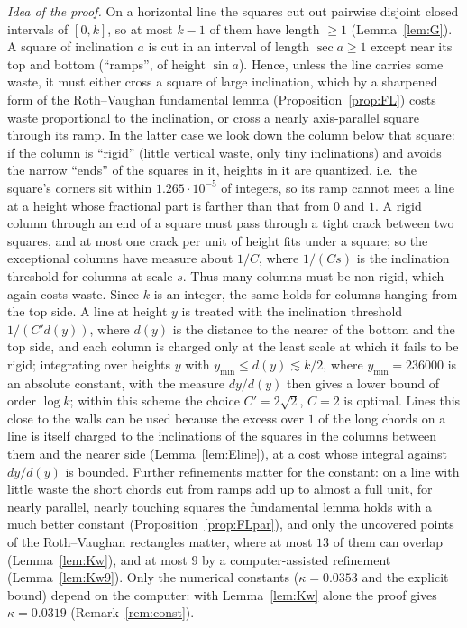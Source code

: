 \documentclass[11pt]{amsart}
\theoremstyle{definition}
\theoremstyle{remark}
\begin{document}
\noindent\emph{Idea of the proof.}
On a horizontal line the squares cut out pairwise disjoint closed intervals of $[0,k]$, so at most $k-1$ of
them have length $\ge 1$ (Lemma~\ref{lem:G}). A square of inclination $a$ is cut in an interval of length
$\sec a\ge 1$ except near its top and bottom (``ramps'', of height $\sin a$). Hence, unless the line carries
some waste, it must either cross a square of large inclination, which by a sharpened form of the Roth--Vaughan fundamental lemma (Proposition~\ref{prop:FL}) costs
waste proportional to the inclination, or cross a nearly axis-parallel square through its ramp. In the latter case
we look down the column below that square: if the column is ``rigid'' (little vertical waste, only tiny
inclinations) and avoids the narrow ``ends'' of the squares in it, heights in it are quantized, i.e.\ the square's
corners sit within $1.265\cdot10^{-5}$ of integers, so its ramp cannot meet a line at a height whose fractional part is
farther than that from $0$ and $1$. A rigid column through an end of a square must pass through a tight crack between
two squares, and at most one crack per unit of height fits under a square; so the exceptional columns have measure about
$1/C$, where $1/(Cs)$ is the inclination threshold for columns at scale $s$. Thus many columns
must be non-rigid, which again costs waste. Since $k$ is an integer, the same holds for columns hanging from the top
side. A line at height $y$ is treated with the inclination threshold $1/(C'd(y))$, where $d(y)$ is the distance to the
nearer of the bottom and the top side, and each column is charged only at the least scale at which it fails to be rigid;
integrating over heights $y$ with $y_{\min}\le d(y)\lesssim k/2$, where $y_{\min}=236000$ is an absolute constant, with the
measure $dy/d(y)$ then gives a lower bound of order $\log k$; within this scheme the choice $C'=2\sqrt2$, $C=2$ is optimal.
Lines this close to the walls can be used because the excess over $1$ of the long chords on a line is itself charged to the
inclinations of the squares in the columns between them and the nearer side (Lemma~\ref{lem:Eline}), at a cost whose integral against $dy/d(y)$ is
bounded. Further refinements matter for the constant: on a line
with little waste the short chords cut from ramps add up to almost a full unit, for nearly parallel, nearly touching
squares the fundamental lemma holds with a much better constant (Proposition~\ref{prop:FLpar}), and only the uncovered points
of the Roth--Vaughan rectangles matter, where at most $13$ of them can overlap (Lemma~\ref{lem:Kw}), and at most $9$ by a
computer-assisted refinement (Lemma~\ref{lem:Kw9}). Only the numerical constants ($\kappa=0.0353$ and the explicit bound)
depend on the computer: with Lemma~\ref{lem:Kw} alone the proof gives $\kappa=0.0319$ (Remark~\ref{rem:const}).
\end{document}
